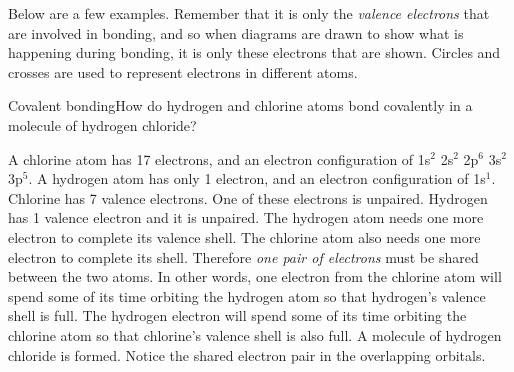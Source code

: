 	\par
        \label{m38704*id138991}Below are a few examples. Remember that it is only the \textsl{valence electrons} that are involved in bonding, and so when diagrams are drawn to show what is happening during bonding, it is only these electrons that are shown. Circles and crosses are used to represent electrons in different atoms.\par 
\label{m38704*secfhsst!!!underscore!!!id98}\vspace{.5cm} 
\begin{wex}{Covalent bonding}{How do hydrogen and chlorine atoms bond covalently in a molecule of hydrogen chloride?}{
A chlorine atom has 17 electrons, and an electron configuration of 1s$^{2}$ 2s$^{2}$ 2p$^{6}$ 3s$^{2}$ 3p$^{5}$. A hydrogen atom has only 1 electron, and an electron configuration of 1s$^{1}$.
Chlorine has 7 valence electrons. One of these electrons is unpaired. Hydrogen has 1 valence electron and it is unpaired.
The hydrogen atom needs one more electron to complete its valence shell. The chlorine atom also needs one more electron to complete its shell. Therefore \textit{one pair of electrons} must be shared between the two atoms. In other words, one electron from the chlorine atom will spend some of its time orbiting the hydrogen atom so that hydrogen's valence shell is full. The hydrogen electron will spend some of its time orbiting the chlorine atom so that chlorine's valence shell is also full. A molecule of hydrogen chloride is formed. Notice the shared electron pair in the overlapping orbitals.
\begin{figure}[H]
\begin{center}
\end{center}
\end{figure}}
\end{wex}
